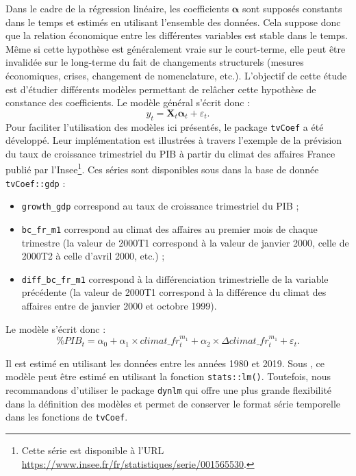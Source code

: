 \documentclass[
  a4paper,
  DIV=11,
  numbers=noendperiod,
  french]{scrartcl}
\newcommand\1{{\mathds 1}}
\newcommand{\bf}[1]{{\boldsymbol #1}}
\theoremstyle{remark}
\begin{document}
Dans le cadre de la régression linéaire, les coefficients \(\bf\alpha\)
sont supposés constants dans le temps et estimés en utilisant l'ensemble
des données. Cela suppose donc que la relation économique entre les
différentes variables est stable dans le temps. Même si cette hypothèse
est généralement vraie sur le court-terme, elle peut être invalidée sur
le long-terme du fait de changements structurels (mesures économiques,
crises, changement de nomenclature, etc.). L'objectif de cette étude est
d'étudier différents modèles permettant de relâcher cette hypothèse de
constance des coefficients. Le modèle général s'écrit donc : \[
y_t={\bf X_t} \bf\alpha_t  +\varepsilon_t.
\] Pour faciliter l'utilisation des modèles ici présentés, le package
 \texttt{tvCoef} \autocite{tvcoef} a été développé.
Leur implémentation est illustrées à travers l'exemple de la prévision
du taux de croissance trimestriel du PIB à partir du climat des affaires
France publié par l'Insee\footnote{ Cette série est disponible à l'URL
  \url{https://www.insee.fr/fr/statistiques/serie/001565530}.}. Ces
séries sont disponibles sous  dans la base de donnée
\texttt{tvCoef::gdp} :

\begin{itemize}
\item
  \texttt{growth\_gdp} correspond au taux de croissance trimestriel du
  PIB ;
\item
  \texttt{bc\_fr\_m1} correspond au climat des affaires au premier mois
  de chaque trimestre (la valeur de 2000T1 correspond à la valeur de
  janvier 2000, celle de 2000T2 à celle d'avril 2000, etc.) ;
\item
  \texttt{diff\_bc\_fr\_m1} correspond à la différenciation
  trimestrielle de la variable précédente (la valeur de 2000T1
  correspond à la différence du climat des affaires entre de janvier
  2000 et octobre 1999).
\end{itemize}

Le modèle s'écrit donc : \[
\% PIB_t=\alpha_0 + \alpha_1\times climat\_fr_t^{m_1} + \alpha_2\times \Delta climat\_fr_t^{m_1}+\varepsilon_t.
\]

Il est estimé en utilisant les données entre les années 1980 et 2019.
Sous , ce modèle peut être estimé en utilisant la
fonction \texttt{stats::lm()}. Toutefois, nous recommandons d'utiliser
le package \texttt{dynlm} \autocite{dynlm} qui offre une plus grande
flexibilité dans la définition des modèles et permet de conserver le
format série temporelle dans les fonctions de \texttt{tvCoef}.
\end{document}
